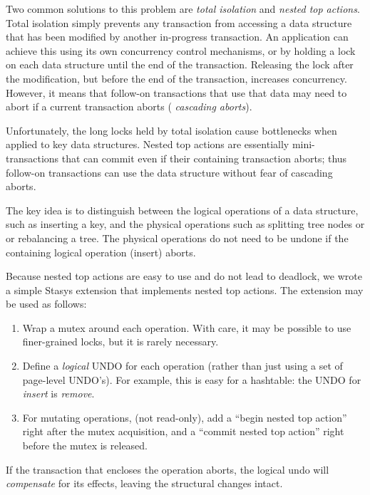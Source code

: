 \documentclass[letterpaper,twocolumn,10pt]{article}
\newcommand{\yad}{Stasys\xspace}
\begin{document}
Two common solutions to this problem are {\em total isolation} and
{\em nested top actions}.  Total isolation simply prevents any
transaction from accessing a data structure that has been modified by
another in-progress transaction.  An application can achieve this
using its own concurrency control mechanisms, or by holding a lock on
each data structure until the end of the transaction.  Releasing the
lock after the modification, but before the end of the transaction,
increases concurrency.  However, it means that follow-on transactions that use
that data may need to abort if a current transaction aborts ({\em
cascading aborts}).  %

Unfortunately, the long locks held by total isolation cause bottlenecks when applied to key
data structures.
Nested top actions are essentially mini-transactions that can
commit even if their containing transaction aborts; thus follow-on
transactions can use the data structure without fear of cascading
aborts.  

The key idea is to distinguish between the logical operations of a
data structure, such as inserting a key, and the physical operations
such as splitting tree nodes or or rebalancing a tree. The physical
operations do not need to be undone if the containing logical operation
(insert) aborts.

Because nested top actions are easy to use and do not lead to 
deadlock, we wrote a simple \yad extension that
implements nested top actions.  The extension may be used as follows:

\begin{enumerate}
\item Wrap a mutex around each operation.  With care, it may be possible to use finer-grained locks, but it is rarely necessary.
\item Define a {\em logical} UNDO for each operation (rather than just using
  a set of page-level UNDO's).  For example, this is easy for a
  hashtable: the UNDO for {\em insert} is {\em remove}.
\item For mutating operations, (not read-only), add a ``begin nested
  top action'' right after the mutex acquisition, and a ``commit
  nested top action'' right before the mutex is released.
\end{enumerate}

\noindent If the transaction that encloses the operation aborts, the logical
undo will {\em compensate} for its effects, leaving the structural
changes intact. 
\end{document}
